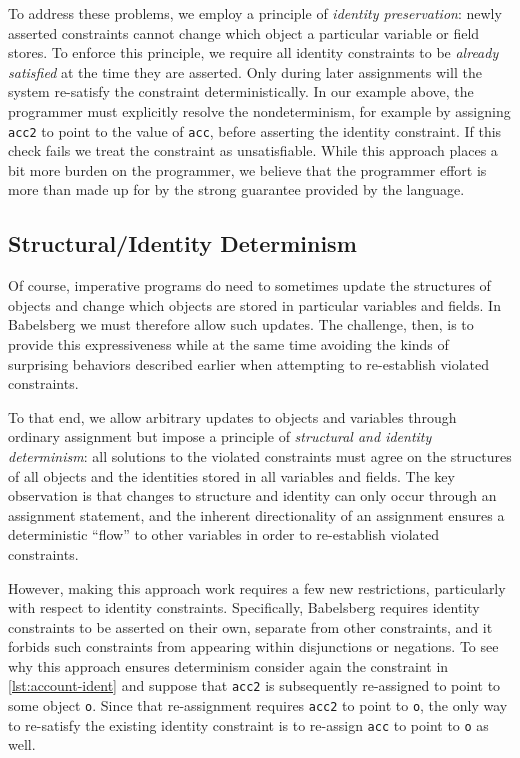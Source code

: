 \documentclass[10pt,reprint]{sigplanconf-preprint}
\begin{document}
To address these problems, we employ a principle of \emph{identity
  preservation}: newly asserted constraints cannot change which object a
particular variable or field stores.  To enforce this principle,
we require all identity constraints to be
\emph{already satisfied} at the time they are asserted. Only
during later assignments will the system re-satisfy the constraint deterministically.
In our example above, the programmer must explicitly resolve the
nondeterminism, for example by assigning \verb!acc2! to point to 
the value of \verb!acc!, before asserting the identity constraint.
If this check fails we treat the constraint as unsatisfiable.  
While
this approach places a bit more burden on the programmer, we believe
that the programmer effort is more than made up for by the strong
guarantee provided by the language.

\subsection{Structural/Identity Determinism}
\label{sec:determinism}

Of course, imperative programs do need to sometimes update the structures of
objects and change which objects are stored in particular variables and
fields.  In Babelsberg we must therefore allow such updates.  The
challenge, then, is to provide this expressiveness while at the same
time avoiding the kinds of surprising behaviors described earlier when
attempting to re-establish violated constraints.  

To that end, we allow arbitrary updates to objects and variables
through ordinary assignment but impose a principle of \emph{structural
  and identity determinism}:  all solutions to the
violated constraints must agree on the structures of all objects and
the identities stored in all variables and fields. The key
observation is that changes to structure and identity can only occur through an
assignment statement, and the inherent directionality of an assignment
ensures a deterministic ``flow'' to other variables in order to
re-establish violated constraints.

However, making this approach work requires a few new restrictions,
particularly with respect to identity constraints.
Specifically, Babelsberg requires identity
constraints to be asserted on their own, separate from other
constraints, and it forbids such constraints from appearing within
disjunctions or negations.  
To see why this approach ensures determinism consider again the constraint in \autoref{lst:account-ident}
 and suppose that
\verb!acc2! is subsequently re-assigned to point to some object {\tt o}.  Since that
re-assignment requires \verb!acc2! to point to {\tt o},
the only
way to re-satisfy the existing identity constraint is to re-assign
\verb!acc! to point to {\tt o} as well.
\end{document}
